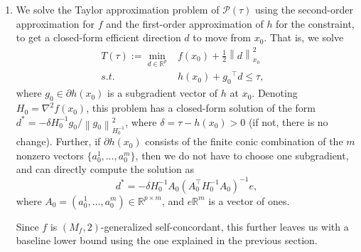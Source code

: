 \documentclass[11pt]{article}
\theoremstyle{definition}
\theoremstyle{remark}
\theoremstyle{plain}
\theoremstyle{definition}
\newcommand{\R}{\mathbb{R}}
\newcommand{\norm}[1]{\left\lVert #1 \right\rVert}
\newcommand{\1}{\mathbf{1}}
\renewcommand{\P}{\mathcal{P}}
\renewcommand{\t}{^{\top}}
\renewcommand{\R}{\mathbb{R}}
\begin{document}
\begin{enumerate}
    \item We solve the Taylor approximation problem of $\P(\tau)$ using the second-order approximation for $f$ and the first-order approximation of $h$ for the constraint, to get a closed-form efficient direction $d$ to move from $x_0$. That is, we solve  
    \begin{equation}
\label{opt:Taylor}
    \begin{array}{rlc}
      \displaystyle T(\tau):= \min_{d \in \R^p} &  f(x_0) + \frac{1}{2}\norm{d}^2_{x_0} \\
        s.t. & h(x_0) + {g_0} \t d \leq \tau, & %
    \end{array}
\end{equation}
    where $g_0\in \partial h(x_0)$ is a subgradient vector of $h$ at $x_0$. Denoting $H_0 = \nabla^2f(x_0)$, this problem has a closed-form solution of the form $d^*= -\delta H_0^{-1}g_0 / \norm{g_0}_{H_0^{-1}}^2$, where $\delta = \tau - h(x_0) > 0$ (if not, there is no change). Further, if $\partial h(x_0)$ consists of the finite conic combination of the $m$ nonzero vectors $\{a_0^1, \ldots, a_0^m\}$, then we do not have to choose one subgradient, and can directly compute the solution as $$d^*= -\delta H_0^{-1}A_0(A_0\t H_0^{-1}A_0)^{-1}e,$$ where $A_0 = (a_0^1, \ldots, a_0^m) \in \R^{p \times m}$, and $e\R^m$ is a vector of ones.
    
    Since $f$ is $(M_f, 2)$-generalized self-concordant, this further leaves us with a baseline lower bound using the one explained in the previous section.


\end{enumerate}
\end{document}
